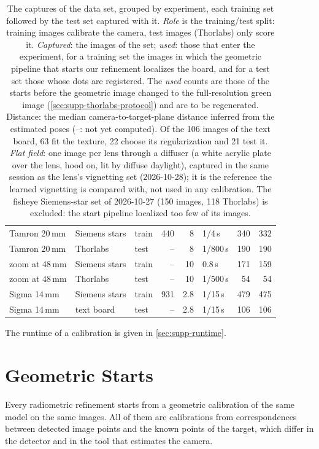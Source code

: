 \begin{table}[t]
\begin{tabular}{@{}lllrrlrr@{}}
    Tamron 20\,mm & Siemens stars & train & 440 & 8 & 1/4\,s & 340 & 332 \\
    Tamron 20\,mm & Thorlabs & test & -- & 8 & 1/800\,s & 190 & 190 \\
    zoom at 48\,mm & Siemens stars & train & -- & 10 & 0.8\,s & 171 & 159 \\
    zoom at 48\,mm & Thorlabs & test & -- & 10 & 1/500\,s & 54 & 54 \\
    Sigma 14\,mm & Siemens stars & train & 931 & 2.8 & 1/15\,s & 479 & 475 \\
    Sigma 14\,mm & text board & test & -- & 2.8 & 1/15\,s & 106 & 106 \\
    \bottomrule
  \end{tabular}
  \caption{The captures of the data set, grouped by experiment, each training set followed by the test set captured with it. \emph{Role} is the training/test split: training images calibrate the camera, test images (Thorlabs) only score it. \emph{Captured}: the images of the set; \emph{used}: those that enter the experiment, \ie for a training set the images in which the geometric pipeline that starts our refinement localizes the board, and for a test set those whose dots are registered. The \emph{used} counts are those of the starts before the geometric image changed to the full-resolution green image (\cref{sec:supp-thorlabs-protocol}) and are to be regenerated. Distance: the median camera-to-target-plane distance inferred from the estimated poses (--: not yet computed). Of the 106 images of the text board, 63 fit the texture, 22 choose its regularization and 21 test it. \emph{Flat field}: one image per lens through a diffuser (a white acrylic plate over the lens, hood on, lit by diffuse daylight), captured in the same session as the lens's vignetting set (2026-10-28); it is the reference the learned vignetting is compared with, not used in any calibration. The fisheye Siemens-star set of 2026-10-27 (150 images, 118 Thorlabs) is excluded: the start pipeline localized too few of its images.}
  \label{tab:supp-dataset}
\end{table}


The runtime of a calibration is given in \cref{sec:supp-runtime}.


\section{Geometric Starts}
\label{sec:supp-starts}
Every radiometric refinement starts from a geometric calibration of
the same model on the same images. All of them are calibrations from
correspondences between detected image points and the known points of
the target, which differ in the detector and in the tool that
estimates the camera.

